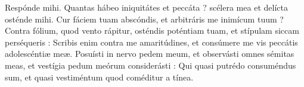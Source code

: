 
Respónde mihi.
Quantas hábeo iniquitátes et peccáta ? scélera mea et delícta osténde mihi.
Cur fáciem tuam abscóndis, et arbitráris me inimícum tuum ?
Contra fólium, quod vento rápitur, osténdis poténtiam tuam, et stípulam siccam perséqueris :
Scribis enim contra me amaritúdines, et consúmere me vis peccátis adolescéntiæ meæ.
Posuísti in nervo pedem meum, et observásti omnes sémitas meas, et vestígia pedum meórum considerásti :
Qui quasi putrédo consuméndus sum, et quasi vestiméntum quod coméditur a tínea.
